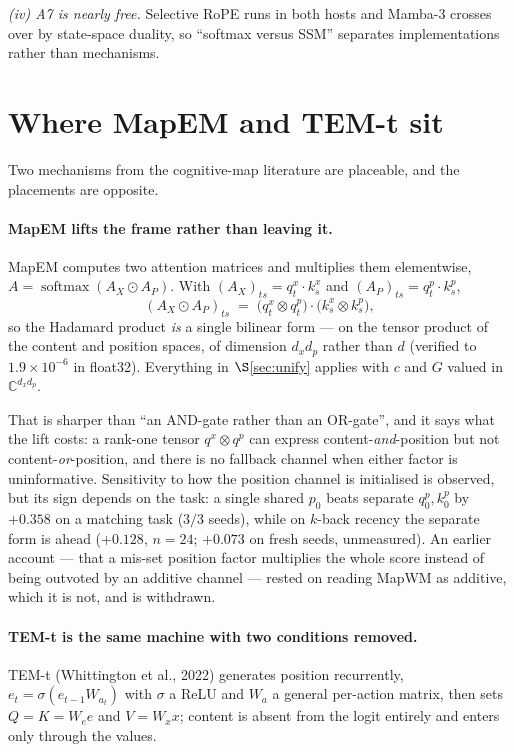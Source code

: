 \documentclass[11pt]{article}
\newcommand{\C}{\mathbb{C}}
\DeclareMathOperator{\softmax}{softmax}
\begin{document}
\emph{(iv) A7 is nearly free.} Selective RoPE runs in both hosts and Mamba-3 crosses
over by state-space duality, so ``softmax versus SSM'' separates implementations
rather than mechanisms.






\section{Where MapEM and TEM-t sit}
\label{sec:emtem}

Two mechanisms from the cognitive-map literature are placeable, and the placements
are opposite.

\paragraph{MapEM lifts the frame rather than leaving it.} MapEM computes two
attention matrices and multiplies them elementwise,
$A = \softmax(A_X \odot A_P)$. With $(A_X)_{ts} = q^x_t\!\cdot\!k^x_s$ and
$(A_P)_{ts} = q^p_t\!\cdot\!k^p_s$,
\[
  (A_X \odot A_P)_{ts} \;=\; \big(q^x_t \otimes q^p_t\big)\cdot\big(k^x_s \otimes k^p_s\big),
\]
so the Hadamard product \emph{is} a single bilinear form --- on the tensor product of
the content and position spaces, of dimension $d_xd_p$ rather than $d$ (verified to
$1.9\times10^{-6}$ in float32). Everything in $\S$\ref{sec:unify} applies with $c$ and
$G$ valued in $\C^{d_xd_p}$.

That is sharper than ``an AND-gate rather than an OR-gate'', and it says what the lift
costs: a rank-one tensor $q^x\otimes q^p$ can express content-\emph{and}-position but
not content-\emph{or}-position, and there is no fallback channel when either factor is
uninformative. Sensitivity to how the position channel is initialised is observed, but
its sign depends on the task: a single shared $p_0$ beats separate $q^p_0, k^p_0$ by
$+0.358$ on a matching task ($3/3$ seeds), while on $k$-back recency the separate form
is ahead ($+0.128$, $n=24$; $+0.073$ on fresh seeds, unmeasured). An earlier account ---
that a mis-set position factor multiplies the whole score instead of being outvoted
by an additive channel --- rested on reading MapWM as additive, which it is not, and is
withdrawn.

\paragraph{TEM-t is the same machine with two conditions removed.} TEM-t
(Whittington et al., 2022) generates position recurrently,
$e_t = \sigma(e_{t-1}W_{a_t})$ with $\sigma$ a ReLU and $W_a$ a general per-action
matrix, then sets $Q = K = W_e e$ and $V = W_x x$; content is absent from the logit
entirely and enters only through the values.
\end{document}
